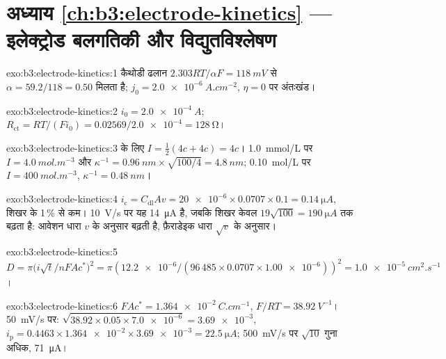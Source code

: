 \section*{अध्याय \ref{ch:b3:electrode-kinetics} --- इलेक्ट्रोड बलगतिकी और विद्युतविश्लेषण}

\begin{solution}{exo:b3:electrode-kinetics:1}
कैथोडी ढलान $2.303RT/\alpha F = \qty{118}{mV}$ से $\alpha = 59.2/118 = 0.50$ मिलता है; $j_0 = \qty{2.0e-6}{A.cm^{-2}}$,
$\eta = 0$ पर अंतःखंड।
\end{solution}

\begin{solution}{exo:b3:electrode-kinetics:2}
$i_0 = \qty{2.0e-4}{A}$; $R_{\mathrm{ct}} = RT/(Fi_0) = 0.02569/\num{2.0e-4} = \qty{128}{\ohm}$।
\end{solution}

\begin{solution}{exo:b3:electrode-kinetics:3}
 के लिए $I = \frac12(4c + 4c) = 4c$। \qty{1.0}{mmol/L} पर $I = \qty{4.0}{mol.m^{-3}}$ और $\kappa^{-1} =
\qty{0.96}{nm} \times \sqrt{100/4} = \qty{4.8}{nm}$; \qty{0.10}{mol/L} पर $I = \qty{400}{mol.m^{-3}}$, $\kappa^{-1} = \qty{0.48}{nm}$।
\end{solution}

\begin{solution}{exo:b3:electrode-kinetics:4}
$i_{\mathrm c} = C_{\mathrm{dl}}Av = \num{20e-6} \times 0.0707 \times 0.1 = \qty{0.14}{\micro A}$, शिखर के 1\,\% से कम।
\qty{10}{V/s} पर यह \qty{14}{\micro A} है, जबकि शिखर केवल $19\sqrt{100} = \qty{190}{\micro A}$ तक बढ़ता है:
आवेशन धारा $v$ के अनुसार बढ़ती है, फ़ैराडेइक धारा $\sqrt v$ के अनुसार।
\end{solution}

\begin{solution}{exo:b3:electrode-kinetics:5}
$D = \pi\bigl(i\sqrt t/nFAc^*\bigr)^2 = \pi(\num{12.2e-6}/(96\,485 \times 0.0707 \times \num{1.00e-6}))^2 =
\qty{1.0e-5}{cm^2.s^{-1}}$।
\end{solution}

\begin{solution}{exo:b3:electrode-kinetics:6}
$FAc^* = \qty{1.364e-2}{C.cm^{-1}}$, $F/RT = \qty{38.92}{V^{-1}}$। \qty{50}{mV/s} पर: $\sqrt{38.92 \times 0.05 \times \num{7.0e-6}} =
\num{3.69e-3}$, $i_{\mathrm p} = 0.4463 \times \num{1.364e-2} \times \num{3.69e-3} = \qty{22.5}{\micro A}$; \qty{500}{mV/s} पर $\sqrt{10}$ गुना
अधिक, \qty{71}{\micro A}।
\end{solution}

